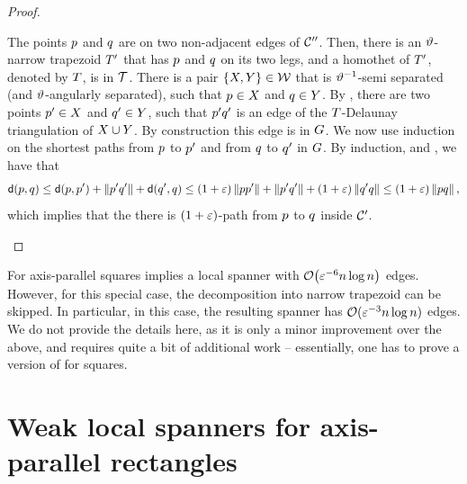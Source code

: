 \documentclass[12pt]{article}%
\begin{document}
\begin{proof}
\begin{compactitem}
        \item The points $p$ and $q$ are on two non-adjacent edges
        of $\mathcal{C}''$. Then, there is an $\vartheta$-narrow trapezoid
        $T'$ that has $p$ and $q$ on its two legs, and a
        homothet of $T'$, denoted by $T$, is in
        $\mathcal{T}$. There is a pair $\{X, Y\} \in \mathcal{W}$ that is
        $\vartheta^{-1}$-semi separated (and $\vartheta$-angularly separated),
        such that $p \in X$ and $q \in Y$.  By
        , there are two points $p' \in X$
        and $q' \in Y$, such that $p'q'$ is an edge of the
        $T$-Delaunay triangulation of $X \cup Y$. By
        construction this edge is in $G$. We now use induction on the
        shortest paths from $p$ to $p'$ and from $q$ to $q'$
        in $G$.  By induction, and , we have
        that
        \begin{equation*}
            \dGY{\pa}{\pb} %
            \leq%
            \dGY{\pa}{\pa'} + \dY{\pa'}{\pb'} + \dGY{\pb'}{\pb} 
            \leq             
            (1+\eps)\dY{\pa}{\pa'} + \dY{\pa'}{\pb'} + (1+\eps)
            \dY{\pb'}{\pb}            
            \leq%
            (1+\eps) \dY{\pa}{\pb},
        \end{equation*}
        which implies that the there is $(1+\varepsilon)$-path from $p$ to
        $q$ inside $\mathcal{C}'$.
    \end{compactitem}
\end{proof}

\begin{remark}
    For axis-parallel squares  implies a local spanner
    with $\Of\pth{\eps^{-6} n \log n}$ edges.  However, for this
    special case, the decomposition into narrow trapezoid can be
    skipped. In particular, in this case, the resulting spanner has
    $\mathcal{O}( \varepsilon^{-3} n \log n)$ edges. We do not provide the details
    here, as it is only a minor improvement over the above, and
    requires quite a bit of additional work -- essentially, one has to
    prove a version of  for squares.
\end{remark}



\section{Weak local spanners for axis-parallel rectangles}
\end{document}
